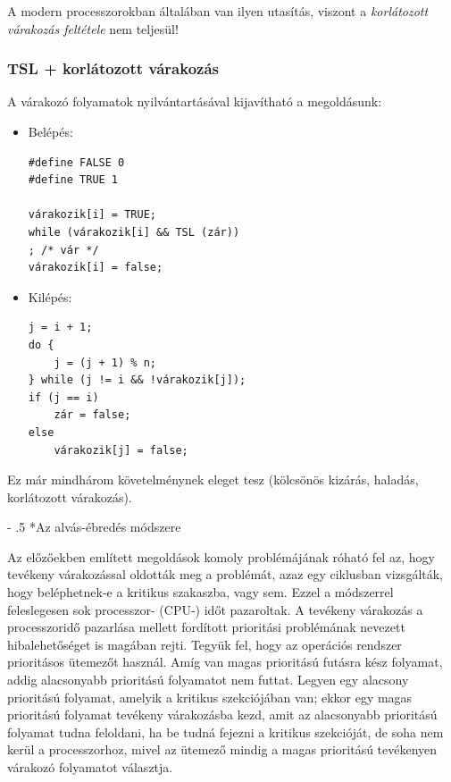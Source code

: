 \documentclass[tikz,12pt,margin=0px]{article}
\makeatletter
\renewcommand\paragraph{%
	\@startsection{paragraph}{4}{0mm}%
	{-\baselineskip}%
	{.5\baselineskip}%
	{\normalfont\normalsize\bfseries}}
\makeatother
\begin{document}
    \noindent A modern processzorokban általában van ilyen utasítás, viszont a \emph{korlátozott várakozás feltétele} nem teljesül!

    \subsubsection*{TSL + korlátozott várakozás}

    A várakozó folyamatok nyilvántartásával kijavítható a megoldásunk:

    \begin{itemize}
        \item Belépés:
        \begin{verbatim}
#define FALSE 0
#define TRUE 1

várakozik[i] = TRUE;
while (várakozik[i] && TSL (zár))
; /* vár */
várakozik[i] = false;
        \end{verbatim}
        \item Kilépés:
        \begin{verbatim}
j = i + 1;
do {
    j = (j + 1) % n;
} while (j != i && !várakozik[j]);
if (j == i)
    zár = false;
else
    várakozik[j] = false;
        \end{verbatim}
    \end{itemize}

    \noindent Ez már mindhárom követelménynek eleget tesz (kölcsönös kizárás, haladás, korlátozott várakozás).

    \paragraph*{Az alvás-ébredés módszere}

    Az előzőekben említett megoldások komoly problémájának róható fel az, hogy tevékeny várakozással oldották meg a problémát, azaz egy ciklusban vizsgálták, hogy beléphetnek-e a kritikus szakaszba, vagy sem. Ezzel a módszerrel feleslegesen sok processzor- (CPU-) időt pazaroltak. A tevékeny várakozás a processzoridő pazarlása mellett fordított prioritási problémának nevezett hibalehetőséget is magában rejti. Tegyük fel, hogy az operációs rendszer prioritásos ütemezőt használ. Amíg van magas prioritású futásra kész folyamat, addig alacsonyabb prioritású folyamatot nem futtat. Legyen egy alacsony prioritású folyamat, amelyik a kritikus szekciójában van; ekkor egy magas prioritású folyamat tevékeny várakozásba kezd, amit az alacsonyabb prioritású folyamat tudna feloldani, ha be tudná fejezni a kritikus szekcióját, de soha nem kerül a processzorhoz, mivel az ütemező mindig a magas prioritású tevékenyen várakozó folyamatot választja.\\
\end{document}
